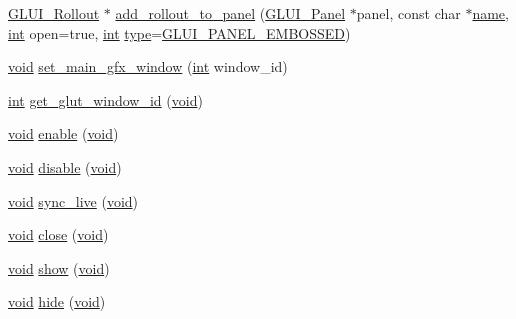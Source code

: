 \begin{DoxyCompactItemize}
\hyperlink{class_g_l_u_i___rollout}{G\+L\+U\+I\+\_\+\+Rollout} $\ast$ \hyperlink{class_g_l_u_i_a4b979713558760e30b4a2faa79a2bb9e}{add\+\_\+rollout\+\_\+to\+\_\+panel} (\hyperlink{class_g_l_u_i___panel}{G\+L\+U\+I\+\_\+\+Panel} $\ast$panel, const char $\ast$\hyperlink{glext_8h_ad977737dfc9a274a62741b9500c49a32}{name}, \hyperlink{wglext_8h_a500a82aecba06f4550f6849b8099ca21}{int} open=true, \hyperlink{wglext_8h_a500a82aecba06f4550f6849b8099ca21}{int} \hyperlink{glext_8h_ab7c1afc09f67635c2c376638fcc0db5f}{type}=\hyperlink{glui_8h_add54979a7b4391067b8a125ee34f690a}{G\+L\+U\+I\+\_\+\+P\+A\+N\+E\+L\+\_\+\+E\+M\+B\+O\+S\+S\+E\+D})
\item 
\hyperlink{wglext_8h_a9e6b7f1933461ef318bb000d6bd13b83}{void} \hyperlink{class_g_l_u_i_adbf3736dbd0334a33677eae1a4baa8b9}{set\+\_\+main\+\_\+gfx\+\_\+window} (\hyperlink{wglext_8h_a500a82aecba06f4550f6849b8099ca21}{int} window\+\_\+id)
\item 
\hyperlink{wglext_8h_a500a82aecba06f4550f6849b8099ca21}{int} \hyperlink{class_g_l_u_i_abf85807ffaab858e84c4e06924fad0da}{get\+\_\+glut\+\_\+window\+\_\+id} (\hyperlink{wglext_8h_a9e6b7f1933461ef318bb000d6bd13b83}{void})
\item 
\hyperlink{wglext_8h_a9e6b7f1933461ef318bb000d6bd13b83}{void} \hyperlink{class_g_l_u_i_abb1c2dc07fbe72c58f4d9340980168a1}{enable} (\hyperlink{wglext_8h_a9e6b7f1933461ef318bb000d6bd13b83}{void})
\item 
\hyperlink{wglext_8h_a9e6b7f1933461ef318bb000d6bd13b83}{void} \hyperlink{class_g_l_u_i_a0007f929ed29394f37b6032578929878}{disable} (\hyperlink{wglext_8h_a9e6b7f1933461ef318bb000d6bd13b83}{void})
\item 
\hyperlink{wglext_8h_a9e6b7f1933461ef318bb000d6bd13b83}{void} \hyperlink{class_g_l_u_i_a0be00b9a4f51c8d37a90ff1258c0fc76}{sync\+\_\+live} (\hyperlink{wglext_8h_a9e6b7f1933461ef318bb000d6bd13b83}{void})
\item 
\hyperlink{wglext_8h_a9e6b7f1933461ef318bb000d6bd13b83}{void} \hyperlink{class_g_l_u_i_a3d37cab3ab684fd10e2f79dd9dcf7d27}{close} (\hyperlink{wglext_8h_a9e6b7f1933461ef318bb000d6bd13b83}{void})
\item 
\hyperlink{wglext_8h_a9e6b7f1933461ef318bb000d6bd13b83}{void} \hyperlink{class_g_l_u_i_a1e1ca1995e99922caae9e7df493187f9}{show} (\hyperlink{wglext_8h_a9e6b7f1933461ef318bb000d6bd13b83}{void})
\item 
\hyperlink{wglext_8h_a9e6b7f1933461ef318bb000d6bd13b83}{void} \hyperlink{class_g_l_u_i_a30c59771996d05b301caea963051e7bc}{hide} (\hyperlink{wglext_8h_a9e6b7f1933461ef318bb000d6bd13b83}{void})

\end{DoxyCompactItemize}
